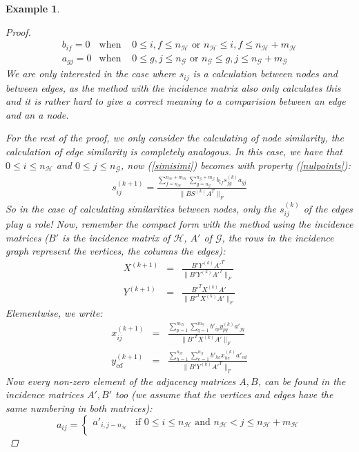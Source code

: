 \documentclass[a4paper,11pt]{report}
\newtheorem{example}[theorem]{Example}
\newcommand{\hgraf}{\mathcal{G}}
\newcommand{\hgrafeen}{\mathcal{H}}
\begin{document}
\begin{example}
\begin{proof}
\begin{eqnarray}\label{nulpoints}
b_{if} = 0  &\text{when }& 0 \leq i,f \leq n_\hgrafeen \text{ or } n_\hgrafeen \leq i,f \leq n_\hgrafeen + 
m_\hgrafeen\\
a_{gj} = 0  &\text{when }& 0 \leq g,j \leq n_\hgraf \text{ or } n_\hgraf \leq g,j \leq n_\hgraf + m_\hgraf
\end{eqnarray}
We are only interested in the case where $s_{ij}$ is a calculation between nodes 
and between edges, as the method with the incidence matrix also only calculates 
this and it is rather hard to give a correct meaning to a comparision between an 
edge and an a node. 

For the rest of the proof, we only consider the calculating of node similarity, the calculation 
of edge similarity is completely analogous. In this case, we have that $0 \leq i \leq n_\hgrafeen$
 and $0 \leq j \leq n_\hgraf$, now (\ref{simisimi}) becomes with property 
 (\ref{nulpoints}):
\begin{eqnarray}s^{(k+1)}_{ij} = \frac{\sum^{n_\hgrafeen + m_\hgrafeen}_{f=n_\hgrafeen}\sum^{n_\hgraf + m_\hgraf}_{g=n_\hgraf} 
b_{if}s^{(k)}_{fg}a_{gj}}{\|BS^{(k)}A^T\|_F}\label{nulnul}\end{eqnarray}
So in the case of calculating similarities between nodes, only the $s_{ij}^{(k)}$ of 
the edges play a role! Now, remember the compact form with the method using the incidence 
matrices ($B'$ is the incidence matrix of $\hgrafeen$, $A'$ of $\hgraf$, the rows in the incidence graph
represent the vertices, the columns the edges):
 \begin{eqnarray}
   X^{(k+1)} &=& \frac{B'Y^{(k)}A'^T}{\|B'Y^{(k)}A'^T\|_F}\\
     Y^{(k+1)} &=& \frac{B'^TX^{(k)}A'}{\|B'^TX^{(k)}A'\|_F}
 \end{eqnarray}
 Elementwise, we write:
 \begin{eqnarray}
  x^{(k+1)}_{ij} &=& \frac{\sum^{m_\hgrafeen}_{p=1}\sum^{m_\hgraf}_{q=1} b'_{ip}y^{(k)}_{pq}a'_{jq}}{\|B'^TX^{(k)}A'\|_F}\label{ikmoetgelijkzijn}\\
  y^{(k+1)}_{cd} &=& \frac{\sum^{n_\hgrafeen}_{h=1}\sum^{n_\hgraf}_{e=1} b'_{hc}x^{(k)}_{he}a'_{ed}}{\|B'Y^{(k)}A'^T\|_F}
 \end{eqnarray}
 Now every non-zero element of the adjacency matrices $A, B$, can be found in the 
 incidence matrices $A', B'$ too (we assume that the vertices and edges have the same numbering in both 
 matrices):
 $$ a_{ij} = \begin{cases} a'_{i,j-n_\hgrafeen} &\text{if } 0\leq i \leq n_\hgrafeen  \text{ and } n_\hgrafeen < j \leq n_\hgrafeen + m_\hgrafeen\\ 

\end{cases}$$
\end{proof}
\end{example}
\end{document}
